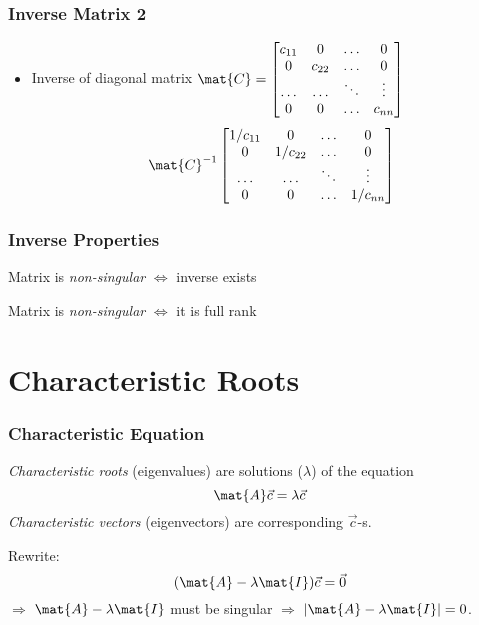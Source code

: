 \documentclass[mathserif, xcolor=table, svgnames]{beamer}
\begin{document}
\begin{frame}
  \frametitle{Inverse Matrix 2}
  \begin{itemize}
  \item Inverse of diagonal matrix
    \begin{math}
      \mat{C} = 
      \begin{bmatrix}
        c_{11} & 0     & \hdots & 0\\
        0     & c_{22} & \hdots & 0\\
        \hdots&\hdots & \ddots & \vdots\\
        0     & 0     & \hdots & c_{nn}\\
      \end{bmatrix}
    \end{math}
    \begin{equation*}
      \mat{C}^{-1}
      \begin{bmatrix}
        1/c_{11} & 0     & \hdots & 0\\
        0     & 1/c_{22} & \hdots & 0\\
        \hdots&\hdots & \ddots & \vdots\\
        0     & 0     & \hdots & 1/c_{nn}\\
      \end{bmatrix}
    \end{equation*}
  \end{itemize}
\end{frame}

\begin{frame}
  \frametitle{Inverse Properties}
  \begin{definition}
    Matrix is \emph{non-singular} $\Leftrightarrow$ inverse exists
  \end{definition}
  \begin{theorem}
    Matrix is \emph{non-singular} $\Leftrightarrow$ it is full rank
  \end{theorem}
\end{frame}

\section[Eigenvalues]{Characteristic Roots}

\begin{frame}
  \frametitle{Characteristic Equation}
  \emph{Characteristic roots} (eigenvalues) are solutions ($\lambda$) of the
  equation
  \begin{equation*}
    \mat{A} \vec{c} = \lambda \vec{c}
  \end{equation*}
  \emph{Characteristic vectors} (eigenvectors) are corresponding $\vec{c}$-s.

  Rewrite:
  \begin{equation*}
    (\mat{A} - \lambda \mat{I})\vec{c} = \vec{0}
  \end{equation*}
  $\Rightarrow$ $\mat{A} - \lambda \mat{I}$ must be singular
  $\Rightarrow$
  $|\mat{A} - \lambda \mat{I}| = 0$.
\end{frame}
\end{document}
